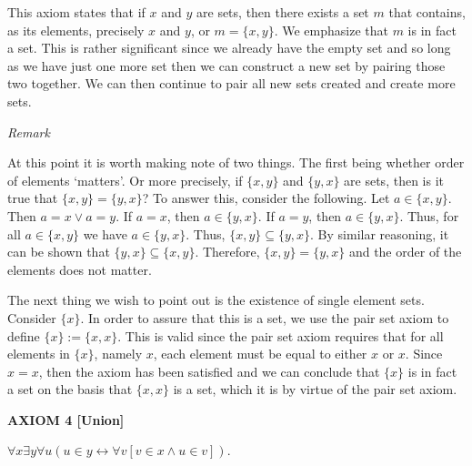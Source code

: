 \documentclass[12pt, a4paper]{article}
\begin{document}
\vspace{4mm}

\noindent This axiom states that if $x$ and $y$ are sets, then there exists a set $m$ that contains, as its elements, precisely $x$ and $y$, or $m=\{x,y\}$. We emphasize that $m$ is in fact a set. This is rather significant since we already have the empty set and so long as we have just one more set then we can construct a new set by pairing those two together. We can then continue to pair all new sets created and create more sets.\par

\vspace{6mm}

\noindent\large{\textit{Remark}}\normalsize\par

\vspace{4mm}

\noindent At this point it is worth making note of two things. The first being whether order of elements `matters'. Or more precisely, if $\{x,y\}$ and $\{y,x\}$ are sets, then is it true that $\{x,y\}=\{y,x\}$? To answer this, consider the following. Let $a\in\{x,y\}$. Then $a=x\vee a=y$. If $a=x$, then $a\in\{y,x\}$. If $a=y$, then $a\in\{y,x\}$. Thus, for all $a\in\{x,y\}$ we have $a\in\{y,x\}$. Thus, $\{x,y\}\subseteq\{y,x\}$. By similar reasoning, it can be shown that $\{y,x\}\subseteq\{x,y\}$. Therefore, $\{x,y\}=\{y,x\}$ and the order of the elements does not matter.\par
The next thing we wish to point out is the existence of single element sets. Consider $\{x\}$. In order to assure that this is a set, we use the pair set axiom to define $\{x\}:=\{x,x\}$. This is valid since the pair set axiom requires that for all elements in $\{x\}$, namely $x$, each element must be equal to either $x$ or $x$. Since $x=x$, then the axiom has been satisfied and we can conclude that $\{x\}$ is in fact a set on the basis that $\{x,x\}$ is a set, which it is by virtue of the pair set axiom.  

\vspace{10mm}

\noindent\blacksquare\textbf{ AXIOM 4 [Union]}\par

\vspace{4mm}

$\forall x\exists y\forall u(u\in y\leftrightarrow\forall v[v\in x\wedge u\in v])$.\par
\end{document}
